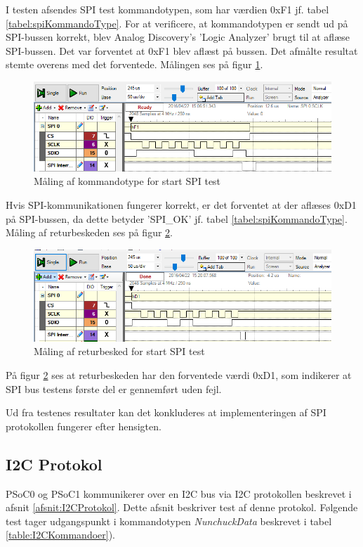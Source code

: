 I testen afsendes SPI test kommandotypen, som har værdien 0xF1 jf. tabel \ref{tabel:spiKommandoType}. For at verificere, at kommandotypen er sendt ud på SPI-bussen korrekt, blev Analog Discovery's 'Logic Analyzer' brugt til at aflæse SPI-bussen. Det var forventet at 0xF1 blev aflæst på bussen. Det afmålte resultat stemte overens med det forventede. Målingen ses på figur \ref{fig:SPItestkommandotype}. 

\begin{figure}[H]
	\centering
	\includegraphics[width=\textwidth]{Test/images/SPItest/SPItestkommandotype}
	\caption{Måling af kommandotype for start SPI test}
	\label{fig:SPItestkommandotype}
\end{figure}

Hvis SPI-kommunikationen fungerer korrekt, er det forventet at der aflæses 0xD1 på SPI-bussen, da dette betyder 'SPI\_OK' jf. tabel \ref{tabel:spiKommandoType}. Måling af returbeskeden ses på figur \ref{fig:SPItestSPIOK}.

\begin{figure}[H]
	\centering
	\includegraphics[width=\textwidth]{Test/images/SPItest/SPItestSPIOK1}
	\caption{Måling af returbesked for start SPI test} 
	\label{fig:SPItestSPIOK}
\end{figure}

På figur \ref{fig:SPItestSPIOK} ses at returbeskeden har den forventede værdi 0xD1, som indikerer at SPI bus testens første del er gennemført uden fejl.

Ud fra testenes resultater kan det konkluderes at implementeringen af SPI protokollen fungerer efter hensigten.



\subsection{I2C Protokol}
PSoC0 og PSoC1 kommunikerer over en I2C bus via I2C protokollen beskrevet i afsnit \ref{afsnit:I2CProtokol}. Dette afsnit beskriver test af denne protokol. Følgende test tager udgangspunkt i kommandotypen \textit{NunchuckData} beskrevet i tabel \ref{table:I2CKommandoer}).

